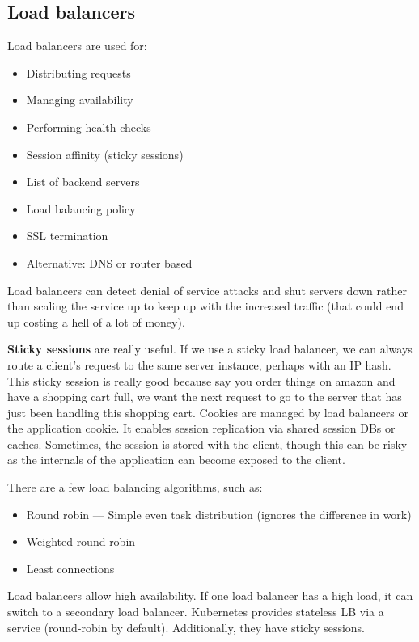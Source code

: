 \documentclass[11pt,a4paper,titlepage,dvipsnames,cmyk]{scrartcl}
\begin{document}
\subsection{Load balancers}
Load balancers are used for:
\begin{itemize}
    \item Distributing requests
    \item Managing availability
    \item Performing health checks
    \item Session affinity (sticky sessions)
    \item List of backend servers
    \item Load balancing policy
    \item SSL termination
    \item Alternative: DNS or router based
\end{itemize}

Load balancers can detect denial of service attacks and shut servers down rather than scaling the service up to keep up with the increased traffic (that could end up costing a hell of a lot of money).

\textbf{Sticky sessions} are really useful. If we use a sticky load balancer, we can always route a client's request to the same server instance, perhaps with an IP hash. This sticky session is really good because say you order things on amazon and have a shopping cart full, we want the next request to go to the server that has just been handling this shopping cart. Cookies are managed by load balancers or the application cookie. It enables session replication via shared session DBs or caches. Sometimes, the session is stored with the client, though this can be risky as the internals of the application can become exposed to the client.

There are a few load balancing algorithms, such as:
\begin{itemize}
    \item Round robin --- Simple even task distribution (ignores the difference in work)
    \item Weighted round robin
    \item Least connections
\end{itemize}

Load balancers allow high availability. If one load balancer has a high load, it can switch to a secondary load balancer. Kubernetes provides stateless LB via a service (round-robin by default). Additionally, they have sticky sessions.
\end{document}
